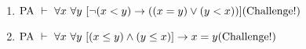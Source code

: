 \documentclass[11pt]{report}
\begin{document}
\begin{enumerate}
\begin{enumerate}
			
			\item $\PA \ \vdash \ \forall x \ \forall y \ [\lnot(x<y) \to ((x=y) \lor (y<x))] \hfill \text{(Challenge!)}$
			
			
			\item $\PA \ \vdash \ \forall x \ \forall y \ [(x\leq y) \land (y\leq x)] \to x=y \hfill \text{(Challenge!)}$
		\end{enumerate}
	 
\end{enumerate}	
\end{document}
